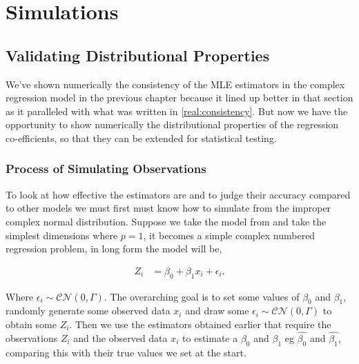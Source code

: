 \documentclass[honours,12pt]{unswthesis}
\numberwithin{equation}{section}
\begin{document}
\newpage


\chapter{Simulations}


\section{Validating Distributional Properties}

We've shown numerically the consistency of the MLE estimators in the complex regression model in the previous chapter because it lined up better in that section as it paralleled with what was written in \ref{real:consistency}. But now we have the opportunity to show numerically the distributional properties of the regression co-efficients, so that they can be extended for statistical testing.


\subsection{Process of Simulating Observations} \label{complex:datagen}

To look at how effective the estimators are and to judge their accuracy compared to other models we must first must know how to simulate from the improper complex normal distribution. Suppose we take the model from  and take the simplest dimensions where $p = 1$, it becomes a simple complex numbered regression problem, in long form the model will be,

\begin{align*}
	Z_{i} &= \beta_{0} + \beta_{1} x_{i} + \epsilon_{i}.
\end{align*}

\noindent Where $\epsilon_{i} \sim \mathcal{CN} (0, \Gamma)$. The overarching goal is to set some values of $\beta_{0}$ and $\beta_{1}$, randomly generate some observed data $x_{i}$ and draw some $\epsilon_{i} \sim \mathcal{CN} (0, \Gamma)$ to obtain some $Z_{i}$. Then we use the estimators obtained earlier that require the observations $Z_{i}$ and the observed data $x_{i}$ to estimate a $\beta_{0}$ and $\beta_{1}$ eg $\widehat{\beta_{0}}$ and $\widehat{\beta_{1}}$, comparing this with their true values we set at the start. \par
\end{document}
